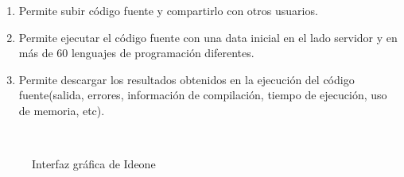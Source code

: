 \begin{enumerate}
  \item Permite subir código fuente y compartirlo con otros usuarios.
  \item Permite ejecutar el código fuente con una data inicial en el lado servidor y en más de 60 lenguajes de programación diferentes.
  \item Permite descargar los resultados obtenidos en la ejecución del código fuente(salida, errores, información de compilación, tiempo de ejecución, uso de memoria, etc).
\end{enumerate}
\begin{figure}[h]
  \centering
  \\
  \caption[Ideone]{Interfaz gráfica de Ideone \protect\cite{ideone}}\label{fig:ideone}
\end{figure}

\newpage
